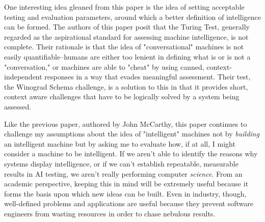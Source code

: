 \documentclass{article}
\begin{document}
  
  \graphicspath{{./images/}}
\par One interesting idea gleaned from this paper is the idea of setting acceptable testing and evaluation parameters, around which a better definition of intelligence can be formed.
The authors of this paper posit that the Turing Test, generally regarded as the aspirational standard for assessing machine intelligence, is not complete.
Their rationale is that the idea of "conversational" machines is not easily quantifiable--humans are either too lenient in defining what is or is not a "conversation," or machines are able to "cheat" by using canned, context-independent responses in a way that evades meaningful assessment.
Their test, the Winograd Schema challenge, is a solution to this in that it provides short, context aware challenges that have to be logically solved by a system being assessed.

\par Like the previous paper, authored by John McCarthy, this paper continues to challenge my assumptions about the idea of "intelligent" machines not by \textit{building} an intelligent machine but by asking me to evaluate how, if at all, I might consider a machine to be intelligent.
If we aren't able to identify the reasons why systems display intelligence, or if we can't establish repeatable, measurable results in AI testing, we aren't really performing computer \textit{science}.
From an academic perspective, keeping this in mind will be extremely useful because it forms the basis upon which new ideas can be built.
Even in industry, though, well-defined problems and applications are useful because they prevent software engineers from wasting resources in order to chase nebulous results.
\end{document}
